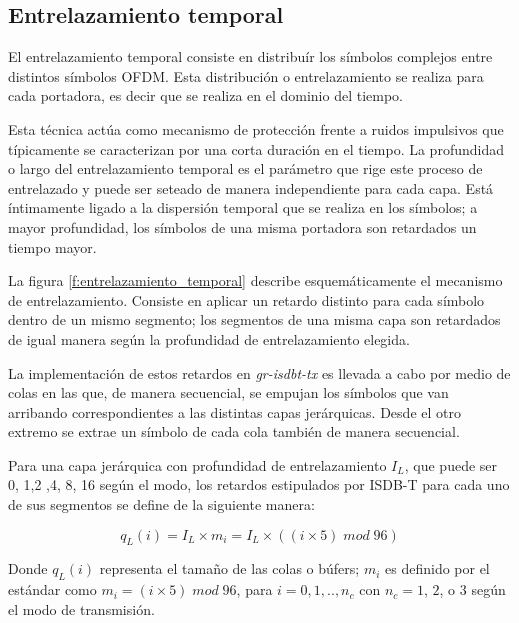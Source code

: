 \subsection{Entrelazamiento temporal}

El entrelazamiento temporal consiste en distribuír los s\'imbolos complejos entre distintos s\'imbolos OFDM. Esta distribuci\'on o entrelazamiento se realiza para cada portadora, es decir que se realiza en el dominio del tiempo.

Esta t\'ecnica act\'ua como mecanismo de protecci\'on frente a ruidos impulsivos que t\'ipicamente se caracterizan por una corta duraci\'on en el tiempo. La profundidad o largo del entrelazamiento temporal es el par\'ametro que rige este proceso de entrelazado y puede ser seteado de manera independiente para cada capa. Est\'a \'intimamente ligado a la dispersi\'on temporal que se realiza en los s\'imbolos; a mayor profundidad, los s\'imbolos de una misma portadora son retardados un tiempo mayor.

La figura \ref{f:entrelazamiento_temporal} describe esquem\'aticamente el mecanismo de entrelazamiento. Consiste en aplicar un retardo distinto para cada s\'imbolo dentro de un mismo segmento; los segmentos de una misma capa son retardados de igual manera seg\'un la profundidad de entrelazamiento elegida. 

La implementaci\'on de estos retardos en \textit{gr-isdbt-tx} es llevada a cabo por medio de colas en las que, de manera secuencial, se empujan los s\'imbolos que van arribando correspondientes a las distintas capas jer\'arquicas. Desde el otro extremo se extrae un s\'imbolo de cada cola tambi\'en de manera secuencial. 

Para una capa jer\'arquica con profundidad de entrelazamiento $I_L$, que puede ser 0, 1,2 ,4, 8, 16 seg\'un el modo, los retardos estipulados por ISDB-T para cada uno de sus segmentos se define de la siguiente manera:

\begin{equation}
q_L(i) = I_L \times m_i = I_L \times ((i \times 5) \; mod \; 96)
\end{equation}

Donde $q_L(i)$ representa el tamaño de las colas o búfers; $m_i$ es definido por el est\'andar como $m_i = (i \times 5) \; mod \; 96$, para $i = 0, 1,..,n_c$ con $n_c = 1$, $2$, o $3$ seg\'un el modo de transmisi\'on. 

